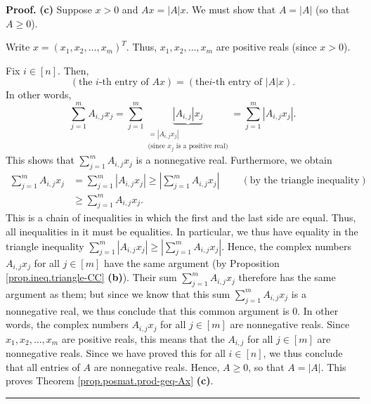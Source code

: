 \documentclass[numbers=enddot,12pt,final,onecolumn,notitlepage]{scrartcl}%
\numberwithin{exer}{subsection}
\theoremstyle{definition}
\newenvironment{proof}[1][Proof]{\noindent\textbf{#1.} }{\ \rule{0.5em}{0.5em}}
\let\sumnonlimits\sum
\renewcommand{\sum}{\sumnonlimits\limits}
\begin{document}
\begin{proof}
\textbf{(c)} Suppose $x>0$ and $Ax=\left\vert A\right\vert x$. We must show
that $A=\left\vert A\right\vert $ (so that $A\geq0$).

Write $x=\left(  x_{1},x_{2},\ldots,x_{m}\right)  ^{T}$. Thus, $x_{1}%
,x_{2},\ldots,x_{m}$ are positive reals (since $x>0$).

Fix $i\in\left[  n\right]  $. Then,%
\[
\left(  \text{the }i\text{-th entry of }Ax\right)  =\left(  \text{the
}i\text{-th entry of }\left\vert A\right\vert x\right)  .
\]
In other words,%
\[
\sum_{j=1}^{m}A_{i,j}x_{j}=\sum_{j=1}^{m}\underbrace{\left\vert A_{i,j}%
\right\vert x_{j}}_{\substack{=\left\vert A_{i,j}x_{j}\right\vert
\\\text{(since }x_{j}\text{ is a positive real)}}}=\sum_{j=1}^{m}\left\vert
A_{i,j}x_{j}\right\vert .
\]
This shows that $\sum_{j=1}^{m}A_{i,j}x_{j}$ is a nonnegative real.
Furthermore, we obtain
\begin{align*}
\sum_{j=1}^{m}A_{i,j}x_{j}  & =\sum_{j=1}^{m}\left\vert A_{i,j}x_{j}%
\right\vert \geq\left\vert \sum_{j=1}^{m}A_{i,j}x_{j}\right\vert
\ \ \ \ \ \ \ \ \ \ \left(  \text{by the triangle inequality}\right)  \\
& \geq\sum_{j=1}^{m}A_{i,j}x_{j}.
\end{align*}
This is a chain of inequalities in which the first and the last side are
equal. Thus, all inequalities in it must be equalities. In particular, we thus
have equality in the triangle inequality $\sum_{j=1}^{m}\left\vert
A_{i,j}x_{j}\right\vert \geq\left\vert \sum_{j=1}^{m}A_{i,j}x_{j}\right\vert
$. Hence, the complex numbers $A_{i,j}x_{j}$ for all $j\in\left[  m\right]  $
have the same argument (by Proposition \ref{prop.ineq.triangle-CC}
\textbf{(b)}). Their sum $\sum_{j=1}^{m}A_{i,j}x_{j}$ therefore has the same
argument as them; but since we know that this sum $\sum_{j=1}^{m}A_{i,j}x_{j}$
is a nonnegative real, we thus conclude that this common argument is $0$. In
other words, the complex numbers $A_{i,j}x_{j}$ for all $j\in\left[  m\right]
$ are nonnegative reals. Since $x_{1},x_{2},\ldots,x_{m}$ are positive reals,
this means that the $A_{i,j}$ for all $j\in\left[  m\right]  $ are nonnegative
reals. Since we have proved this for all $i\in\left[  n\right]  $, we thus
conclude that all entries of $A$ are nonnegative reals. Hence, $A\geq0$, so
that $A=\left\vert A\right\vert $. This proves Theorem
\ref{prop.posmat.prod-geq-Ax} \textbf{(c)}.
\end{proof}
\end{document}
